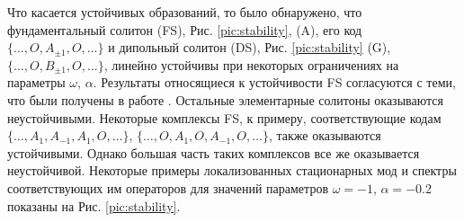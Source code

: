 Что касается устойчивых образований, то было обнаружено, что фундаментальный солитон (FS), Рис. \ref{pic:stability}, (A), его код $\{ \dots, O, A_{\pm 1}, O, \dots \}$ и дипольный солитон (DS), Рис. \ref{pic:stability} (G), $\{ \dots, O, B_{\pm 1}, O, \dots \}$, линейно устойчивы при некоторых ограничениях на параметры $\omega$, $\alpha$.
Результаты относящиеся к устойчивости FS согласуются с теми, что были получены в работе \cite{Malomed}.
Остальные элементарные солитоны оказываются неустойчивыми.
Некоторые комплексы FS, к примеру, соответствующие кодам $\{ \dots, A_1, A_{-1}, A_1, O, \dots \}$, $\{ \dots, O, A_1, O, A_{-1}, O, \dots \}$, также оказываются устойчивыми.
Однако большая часть таких комплексов все же оказывается неустойчивой.
Некоторые примеры локализованных стационарных мод и спектры соответствующих им операторов для значений параметров $\omega = -1$, $\alpha = -0.2$ показаны на Рис. \ref{pic:stability}.
%
